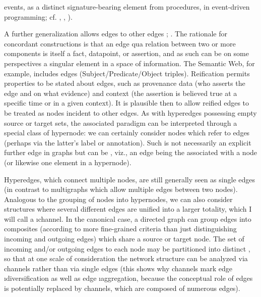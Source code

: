 {\begin{description}
events, as a distinct signature-bearing element from 
procedures, in event-driven programming; 
cf. \cite{JenniferPaykin}, 
\cite{PaykinKrishnaswami}, \cite{WolfgangJeltsch}). 
\item[Edges Incident to Edges]  A further generalization 
allows edges to  other edges 
\cite[p. 10]{BalintMolnar}; \cite[p. 13]{BenGoertzel}.
The rationale for concordant constructions is that 
an edge \mdash{} qua relation between two or more 
components \mdash{} is itself a fact, datapoint, or 
assertion, and as such can be on some perspectives a 
singular element in a space of information.  
The Semantic Web, for example, includes  
edges (Subject/Predicate/Object triples).  
Reification permits properties to be stated about edges, 
such as provenance data (who asserts the edge and on 
what evidence) and context (the assertion is believed true 
at a specific time or in a given context).  
It is plausible then to allow reified edges 
to be treated as nodes incident to other edges.  As 
with hyperedges possessing empty source or target 
sets, the associated paradigm can be interpreted through 
a special class of hypernode: we can certainly 
consider nodes which refer to edges (perhaps via the 
latter's label or annotation).  Such  
is not necessarily an explicit further edge in graphs 
but can be , viz., an edge being the 
 associated with a node (or likewise 
one element in a hypernode).
\item[Channels]   Hyperedges, which connect multiple 
nodes, are still generally seen as single edges 
(in contrast to multigraphs which allow multiple 
edges between two nodes).  Analogous to the grouping 
of nodes into hypernodes, we can also consider structures 
where several different edges are unified into a larger 
totality, which I will call a \i{channel}.  
In the canonical case, a directed graph can group 
edges into composites (according to more fine-grained criteria 
than just distinguishing incoming and outgoing edges) which share a 
source or target node.  The set of incoming and/or outgoing  edges 
to each node may be partitioned into distinct 
, so that at one scale of consideration the network 
structure can be analyzed via channels rather than via 
single edges (this shows why channels mark edge \i{diversification} 
as well as edge \i{aggregation}, because the conceptual role 
of edges is potentially replaced by channels, which are composed 
of numerous edges).
\\\hspace*{3em}

\end{description}}
